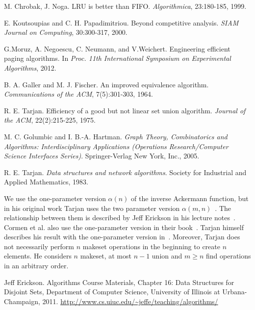 \documentclass[a4paper,12pt, titlepage]{article}  %
\begin{document}
\begin{thebibliography}{99}
         M. Chrobak, J. Noga. LRU is better than FIFO. \emph{Algorithmica}, 23:180-185, 1999.

	E. Koutsoupias and C. H. Papadimitriou. Beyond competitive analysis. \emph{SIAM
	Journal on Computing}, 30:300-317, 2000.

        G.Moruz, A. Negoescu, C. Neumann, and V.Weichert. Engineering efficient paging
        algorithms. In \emph{Proc. 11th International Symposium on Experimental Algorithms},
        2012. 

	  B. A. Galler and M. J. Fischer. An improved equivalence algorithm. 
	  \textit{Communications of the ACM}, 7(5):301-303, 1964.
	
	  R. E. Tarjan. Efficiency of a good but not linear set union algorithm. 
	  \textit{Journal of the ACM}, 22(2):215-225, 1975.  
	  
	  M. C. Golumbic and I. B.-A. Hartman. \emph{Graph Theory, Combinatorics and Algorithms:
	Interdisciplinary Applications (Operations Research/Computer Science
	Interfaces Series)}. Springer-Verlag New York, Inc., 2005.
	
	  R. E. Tarjan. \emph{Data structures and network algorithms}. Society for Industrial and
    Applied Mathematics, 1983.
  
        We use the one-parameter version $\alpha(n)$ of the inverse Ackermann function, but in his original work
        Tarjan uses the two parameter version $\alpha(m,n)$~\cite{tarjan83,tarjan75}. The relationship between them is described by Jeff 
        Erickson in his lecture notes~\cite{jeffe}. Cormen et al. also use the one-parameter version in their book~\cite{cormen_CLRS}.
	Tarjan himself describes his result with the one-parameter version in~\cite{tarjan_golumbic}.   
        Moreover, Tarjan does not necessarily perform $n$ makeset operations in the beginning to create $n$ elements. 
        He considers $n$ makeset, at most $n-1$ union and $m \geq n$ find operations in an arbitrary order.
	
         Jeff Erickson. Algorithms Course Materials,
        Chapter 16: Data Structures for Disjoint Sets,  
	Department of Computer Science, University of Illinois at Urbana-Champaign, 2011.
        \url{http://www.cs.uiuc.edu/~jeffe/teaching/algorithms/}


\end{thebibliography}
\end{document}
